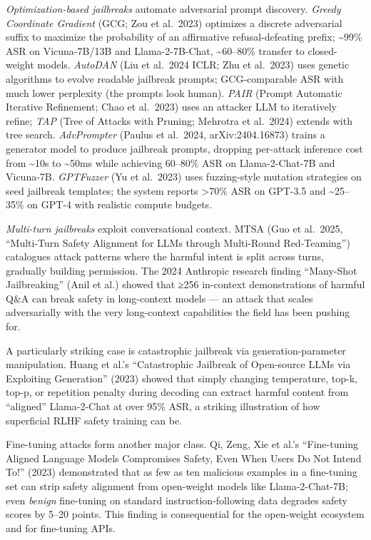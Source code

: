 \documentclass{article}
\begin{document}
\emph{Optimization-based jailbreaks} automate adversarial prompt discovery. \emph{Greedy Coordinate Gradient} (GCG; Zou et al.~2023) optimizes a discrete adversarial suffix to maximize the probability of an affirmative refusal-defeating prefix; \textasciitilde99\% ASR on Vicuna-7B/13B and Llama-2-7B-Chat, \textasciitilde60--80\% transfer to closed-weight models. \emph{AutoDAN} (Liu et al.~2024 ICLR; Zhu et al.~2023) uses genetic algorithms to evolve readable jailbreak prompts; GCG-comparable ASR with much lower perplexity (the prompts look human). \emph{PAIR} (Prompt Automatic Iterative Refinement; Chao et al.~2023) uses an attacker LLM to iteratively refine; \emph{TAP} (Tree of Attacks with Pruning; Mehrotra et al.~2024) extends with tree search. \emph{AdvPrompter} (Paulus et al.~2024, arXiv:2404.16873) trains a generator model to produce jailbreak prompts, dropping per-attack inference cost from \textasciitilde10s to \textasciitilde50ms while achieving 60--80\% ASR on Llama-2-Chat-7B and Vicuna-7B. \emph{GPTFuzzer} (Yu et al.~2023) uses fuzzing-style mutation strategies on seed jailbreak templates; the system reports \textgreater70\% ASR on GPT-3.5 and \textasciitilde25--35\% on GPT-4 with realistic compute budgets.

\emph{Multi-turn jailbreaks} exploit conversational context. MTSA (Guo et al.~2025, ``Multi-Turn Safety Alignment for LLMs through Multi-Round Red-Teaming'') catalogues attack patterns where the harmful intent is split across turns, gradually building permission. The 2024 Anthropic research finding ``Many-Shot Jailbreaking'' (Anil et al.) showed that ≥256 in-context demonstrations of harmful Q\&A can break safety in long-context models --- an attack that scales adversarially with the very long-context capabilities the field has been pushing for.

A particularly striking case is catastrophic jailbreak via generation-parameter manipulation. Huang et al.'s ``Catastrophic Jailbreak of Open-source LLMs via Exploiting Generation'' (2023) showed that simply changing temperature, top-k, top-p, or repetition penalty during decoding can extract harmful content from ``aligned'' Llama-2-Chat at over 95\% ASR, a striking illustration of how superficial RLHF safety training can be.

Fine-tuning attacks form another major class. Qi, Zeng, Xie et al.'s ``Fine-tuning Aligned Language Models Compromises Safety, Even When Users Do Not Intend To!'' (2023) demonstrated that as few as ten malicious examples in a fine-tuning set can strip safety alignment from open-weight models like Llama-2-Chat-7B; even \emph{benign} fine-tuning on standard instruction-following data degrades safety scores by 5--20 points. This finding is consequential for the open-weight ecosystem and for fine-tuning APIs.
\end{document}
